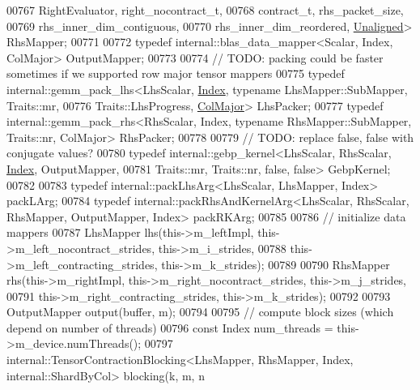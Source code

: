 \begin{DoxyCode}
00767                                                    RightEvaluator, right\_nocontract\_t,
00768                                                    contract\_t, rhs\_packet\_size,
00769                                                    rhs\_inner\_dim\_contiguous,
00770                                                    rhs\_inner\_dim\_reordered, 
      \hyperlink{group__enums_gga45fe06e29902b7a2773de05ba27b47a1ac935220b4c844108e183ebe30a4d5204}{Unaligned}> RhsMapper;
00771 
00772     \textcolor{keyword}{typedef} internal::blas\_data\_mapper<Scalar, Index, ColMajor> OutputMapper;
00773 
00774     \textcolor{comment}{// TODO: packing could be faster sometimes if we supported row major tensor mappers}
00775     \textcolor{keyword}{typedef} internal::gemm\_pack\_lhs<LhsScalar, \hyperlink{namespace_eigen_a62e77e0933482dafde8fe197d9a2cfde}{Index}, \textcolor{keyword}{typename} LhsMapper::SubMapper, Traits::mr,
00776                                     Traits::LhsProgress, \hyperlink{group__enums_ggaacded1a18ae58b0f554751f6cdf9eb13a0cbd4bdd0abcfc0224c5fcb5e4f6669a}{ColMajor}> LhsPacker;
00777     \textcolor{keyword}{typedef} internal::gemm\_pack\_rhs<RhsScalar, Index, typename RhsMapper::SubMapper, Traits::nr, ColMajor> 
      RhsPacker;
00778 
00779     \textcolor{comment}{// TODO: replace false, false with conjugate values?}
00780     \textcolor{keyword}{typedef} internal::gebp\_kernel<LhsScalar, RhsScalar, \hyperlink{namespace_eigen_a62e77e0933482dafde8fe197d9a2cfde}{Index}, OutputMapper,
00781                                   Traits::mr, Traits::nr, \textcolor{keyword}{false}, \textcolor{keyword}{false}> GebpKernel;
00782 
00783     \textcolor{keyword}{typedef} internal::packLhsArg<LhsScalar, LhsMapper, Index> packLArg;
00784     \textcolor{keyword}{typedef} internal::packRhsAndKernelArg<LhsScalar, RhsScalar, RhsMapper, OutputMapper, Index> packRKArg;
00785 
00786     \textcolor{comment}{// initialize data mappers}
00787     LhsMapper lhs(this->m\_leftImpl, this->m\_left\_nocontract\_strides, this->m\_i\_strides,
00788                   this->m\_left\_contracting\_strides, this->m\_k\_strides);
00789 
00790     RhsMapper rhs(this->m\_rightImpl, this->m\_right\_nocontract\_strides, this->m\_j\_strides,
00791                   this->m\_right\_contracting\_strides, this->m\_k\_strides);
00792 
00793     OutputMapper output(buffer, m);
00794 
00795     \textcolor{comment}{// compute block sizes (which depend on number of threads)}
00796     \textcolor{keyword}{const} Index num\_threads = this->m\_device.numThreads();
00797     internal::TensorContractionBlocking<LhsMapper, RhsMapper, Index, internal::ShardByCol> blocking(k, m, n

\end{DoxyCode}
